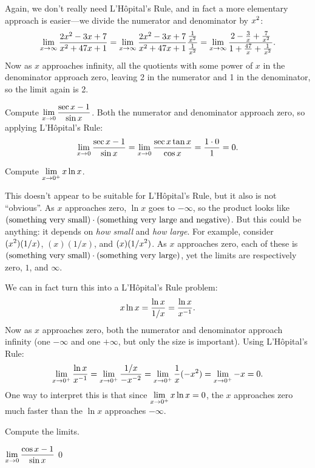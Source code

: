 Again, we don't really need L'H\^opital's Rule, and in fact a more
elementary approach is easier---we divide the numerator and
denominator by $\displaystyle x^2$:
$$\lim_{x\to \infty}{2x^2-3x+7\over x^2+47x+1}=
\lim_{x\to \infty}{2x^2-3x+7\over x^2+47x+1}{{1\over x^2}\over {1\over
    x^2}}=
\lim_{x\to \infty}{2-{3\over x}+{7\over x^2}\over
1+{47\over x}+{1\over x^2}}.$$
Now as $x$ approaches infinity, all the quotients with some power of
$x$ in the denominator approach zero, leaving 2 in the numerator and 1
in the denominator, so the limit again is 2.
\endexample

\example Compute $\displaystyle\lim_{x\to 0}{\sec x - 1\over \sin x}$.
\msk
Both the numerator and denominator approach zero, so applying 
L'H\^opital's Rule:
$$\lim_{x\to 0}{\sec x - 1\over \sin x}=
\lim_{x\to 0}{\sec x\tan x\over \cos x}={1\cdot 0\over 1}=0.$$
\vskip -16pt
\endexample

\iflatetranscendentals
\elselatetranscendentals
\example Compute $\displaystyle\lim_{x\to 0^+} x\ln x$.

This doesn't appear to be suitable for L'H\^opital's Rule, but it also
is not ``obvious''. As $x$ approaches zero, $\ln x$ goes to $-\infty$,
so the product looks like $(\hbox{something very small})\cdot 
(\hbox{something very large and negative})$. But this could be
anything: it depends on {\em how small\/} and {\em how large}. 
For example, consider $\displaystyle (x^2)(1/x)$, $(x)(1/x)$, and $\displaystyle (x)(1/x^2)$. As
$x$ approaches zero, each of these is $(\hbox{something very small})\cdot 
(\hbox{something very large})$, yet the limits are respectively 
zero, $1$, and $\infty$.

We can
in fact turn this into a L'H\^opital's Rule problem:
$$x\ln x = {\ln x\over 1/x}={\ln x\over x^{-1}}.$$
Now as $x$ approaches zero, both the numerator and denominator
approach infinity (one $-\infty$ and one $+\infty$, but only the size
is important). Using  L'H\^opital's Rule:
$$\lim_{x\to 0^+} {\ln x\over x^{-1}}=
\lim_{x\to 0^+} {1/x\over -x^{-2}} =\lim_{x\to 0^+} {1\over x}(-x^2)=
\lim_{x\to 0^+} -x = 0.$$
One way to interpret this is that since $\displaystyle\lim_{x\to
  0^+}x\ln x = 0$, the $x$ approaches zero much faster than the $\ln x$
approaches $-\infty$.
\endexample
\filatetranscendentals

\exercises

Compute the limits.

\twocol

\exercise $\displaystyle\lim_{x\to 0} {\cos x -1\over \sin x}$
\answer $0$
\endanswer

